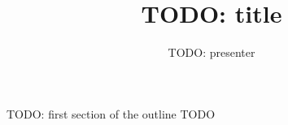 \documentclass[aspectratio=169]{beamer}
\title{TODO: title}
\author{TODO: presenter}
\date{}
\begin{document}
\begin{frame}
  \titlepage
\end{frame}
\begin{frame}{TODO: first section of the outline}
  TODO
\end{frame}
\end{document}
